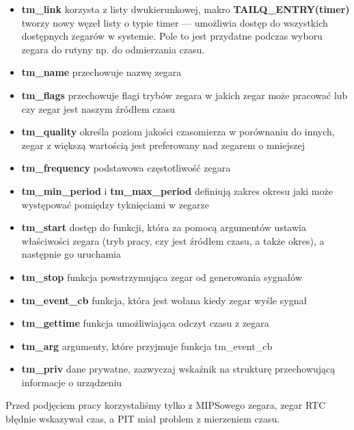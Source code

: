 \documentclass[shortabstract]{iithesis}
\theoremstyle{definition} \newtheorem*{definition}{Definicja}
\theoremstyle{definition} \newtheorem*{example}{Przykład}
\theoremstyle{definition} \newtheorem*{remark}{Uwaga}
\begin{document}
\begin{itemize}

\item \textbf{tm\_link} korzysta z listy dwukierunkowej, makro \textbf{TAILQ\_ENTRY(timer)} tworzy  nowy węzeł listy o typie timer \cite{bib:tailq-man} --- umożliwia dostęp do wszystkich dostępnych zegarów w systemie. Pole to jest przydatne podczas wyboru zegara do rutyny np. do odmierzania czasu. 

\item \textbf{tm\_name} przechowuje nazwę zegara

\item \textbf{tm\_flags} przechowuje flagi trybów zegara w jakich zegar może pracować lub czy zegar jest naszym źródłem czasu

\item \textbf{tm\_quality} określa poziom jakości czasomierza w porównaniu do innych, zegar z większą wartością jest preferowany nad zegarem o mniejszej

\item \textbf{tm\_frequency} podstawowa częstotliwość zegara

\item \textbf{tm\_min\_period} i \textbf{tm\_max\_period} definiują zakres okresu jaki może występować pomiędzy tyknięciami w zegarze

\item \textbf{tm\_start} dostęp do funkcji, która za pomocą argumentów ustawia właściwości zegara (tryb pracy, czy jest źródłem czasu, a także okres), a następnie go uruchamia

\item \textbf{tm\_stop} funkcja powstrzymująca zegar od generowania sygnałów

\item \textbf{tm\_event\_cb} funkcja, która jest wołana kiedy zegar wyśle sygnał

\item \textbf{tm\_gettime} funkcja umożliwiająca odczyt czasu z zegara

\item \textbf{tm\_arg} argumenty, które przyjmuje funkcja tm\_event\_cb

\item \textbf{tm\_priv} dane prywatne, zazwyczaj wskaźnik na strukturę przechowującą informacje o urządzeniu
\end{itemize}

Przed podjęciem pracy korzystaliśmy tylko z MIPSowego zegara, zegar RTC błędnie wskazywał czas, a PIT miał problem z mierzeniem czasu.
\end{document}

